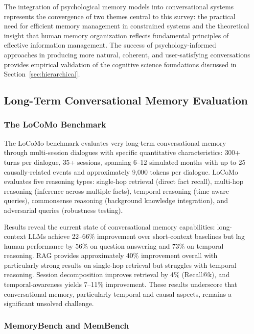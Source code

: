 \documentclass[11pt,letterpaper]{article}
\begin{document}
The integration of psychological memory models into conversational systems represents the convergence of two themes central to this survey: the practical need for efficient memory management in constrained systems and the theoretical insight that human memory organization reflects fundamental principles of effective information management. The success of psychology-informed approaches in producing more natural, coherent, and user-satisfying conversations provides empirical validation of the cognitive science foundations discussed in Section~\ref{sec:hierarchical}.

\subsection{Long-Term Conversational Memory Evaluation}

\subsubsection{The LoCoMo Benchmark}

The LoCoMo benchmark evaluates very long-term conversational memory through multi-session dialogues with specific quantitative characteristics: 300+ turns per dialogue, 35+ sessions, spanning 6--12 simulated months with up to 25 causally-related events and approximately 9,000 tokens per dialogue. LoCoMo evaluates five reasoning types: single-hop retrieval (direct fact recall), multi-hop reasoning (inference across multiple facts), temporal reasoning (time-aware queries), commonsense reasoning (background knowledge integration), and adversarial queries (robustness testing).

Results reveal the current state of conversational memory capabilities: long-context LLMs achieve 22--66\% improvement over short-context baselines but lag human performance by 56\% on question answering and 73\% on temporal reasoning. RAG provides approximately 40\% improvement overall with particularly strong results on single-hop retrieval but struggles with temporal reasoning. Session decomposition improves retrieval by 4\% (Recall@k), and temporal-awareness yields 7--11\% improvement. These results underscore that conversational memory, particularly temporal and causal aspects, remains a significant unsolved challenge.

\subsubsection{MemoryBench and MemBench}
\end{document}
